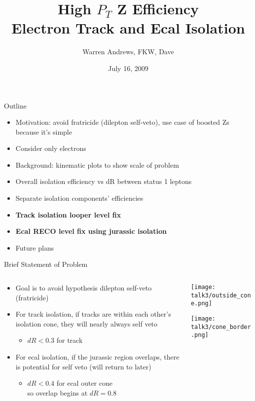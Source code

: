 \documentclass{beamer}
\title[High $P_T$ Z Efficiency]{High $P_T$ Z Efficiency\\Electron Track and Ecal Isolation}
\author{Warren Andrews, FKW, Dave}
\institute{UCSD}
\date{July 16, 2009}
\begin{document}
\begin{frame}
\titlepage
\end{frame}


\begin{frame}{Outline}
  \begin{itemize}
    \item Motivation: avoid fratricide (dilepton self-veto), use case of boosted Zs because it's simple
    \item Consider only electrons
    \item Background: kinematic plots to show scale of problem
    \item Overall isolation efficiency vs dR between status 1 leptons
    \item Separate isolation components' efficiencies
    \item \textbf{Track isolation looper level fix}
    \item \textbf{Ecal RECO level fix using jurassic isolation}
    \item Future plans
  \end{itemize}
\end{frame}


\begin{frame}{Brief Statement of Problem}
  \begin{columns}
    \begin{column}{5.5cm}
      
      \begin{itemize}
      \item Goal is to avoid hypothesis dilepton self-veto (fratricide)
      \item For track isolation, if tracks are within each other's isolation cone, they will nearly always self veto
        \begin{itemize}
        \item $dR < 0.3$ for track
        \end{itemize}
      \item For ecal isolation, if the jurassic region overlaps, there is potential for self veto (will return to later)
        \begin{itemize}
        \item $dR < 0.4$ {\small{for ecal outer cone}}\\ so overlap begins at $dR = 0.8$
        \end{itemize}
      \end{itemize}
      
    \end{column}
    
    \begin{column}{7cm}
      \texttt{[image: talk3/outside\_cone.png]}

      \texttt{[image: talk3/cone\_border.png]}
    \end{column}
  \end{columns}
\end{frame}
\end{document}
